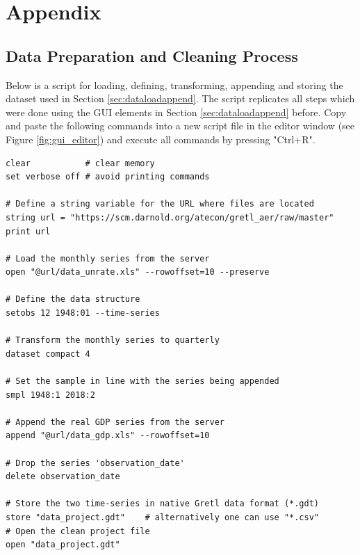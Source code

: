 \documentclass[11pt]{article}
\newcommand{\remph}[1]{{\color{myred}#1}}
\begin{document}
\section{Appendix}




\subsection{Data Preparation and Cleaning Process}
\label{sec:datapre}
Below is a script for loading, defining, transforming, appending and storing the dataset used in Section \ref{sec:dataloadappend}. The script replicates all steps which were done using the GUI elements in Section \ref{sec:dataloadappend} before. Copy and paste the following commands into a new script file in the editor window (see Figure \ref{fig:gui_editor}) and execute all commands by pressing "Ctrl+R".

\begin{Verbatim}[baselinestretch=0.75, frame=single, fontsize=\small]
clear			# clear memory
set verbose off	# avoid printing commands

# Define a string variable for the URL where files are located
string url = "https://scm.darnold.org/atecon/gretl_aer/raw/master"
print url

# Load the monthly series from the server
open "@url/data_unrate.xls" --rowoffset=10 --preserve

# Define the data structure
setobs 12 1948:01 --time-series

# Transform the monthly series to quarterly
dataset compact 4

# Set the sample in line with the series being appended
smpl 1948:1 2018:2

# Append the real GDP series from the server
append "@url/data_gdp.xls" --rowoffset=10

# Drop the series 'observation_date'
delete observation_date

# Store the two time-series in native Gretl data format (*.gdt)
store "data_project.gdt"	# alternatively one can use "*.csv"
# Open the clean project file
open "data_project.gdt"
\end{Verbatim}
\end{document}
